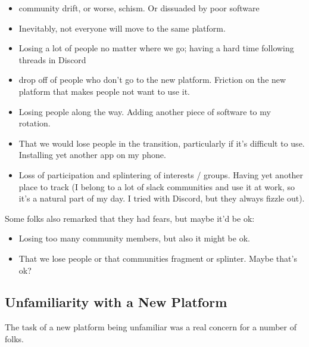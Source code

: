 \documentclass[
]{book}
\providecommand{\tightlist}{%
  \setlength{\itemsep}{0pt}\setlength{\parskip}{0pt}}
\begin{document}
\begin{itemize}
\tightlist
\item
  community drift, or worse, schism. Or dissuaded by poor software
\item
  Inevitably, not everyone will move to the same platform.
\item
  Losing a lot of people no matter where we go; having a hard time following threads in Discord
\item
  drop off of people who don't go to the new platform. Friction on the new platform that makes people not want to use it.
\item
  Losing people along the way. Adding another piece of software to my rotation.
\item
  That we would lose people in the transition, particularly if it's difficult to use. Installing yet another app on my phone.
\item
  Loss of participation and splintering of interests / groups. Having yet another place to track (I belong to a lot of slack communities and use it at work, so it's a natural part of my day. I tried with Discord, but they always fizzle out).
\end{itemize}

Some folks also remarked that they had fears, but maybe it'd be ok:

\begin{itemize}
\tightlist
\item
  Losing too many community members, but also it might be ok.
\item
  That we lose people or that communities fragment or splinter. Maybe that's ok?
\end{itemize}

\subsection{Unfamiliarity with a New Platform}\label{unfamiliarity-with-a-new-platform}

The task of a new platform being unfamiliar was a real concern for a number of folks.
\end{document}
